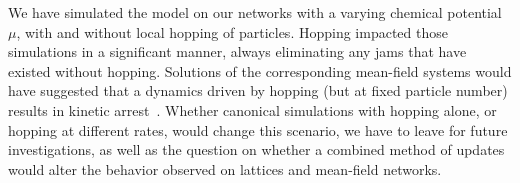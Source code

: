 We have simulated the model on our networks with a varying chemical potential $\mu$,
with and without local hopping of particles. Hopping impacted those
simulations in a significant manner, always eliminating any jams that have existed without hopping. Solutions of the corresponding mean-field systems  would have suggested that a dynamics driven by hopping (but at fixed particle number) results in kinetic arrest~\cite{Rivoire03}. Whether canonical simulations with
hopping alone, or hopping at different rates, would change this scenario, we have to leave for future investigations, as well as the question
on whether a combined method of updates would alter the behavior observed
on lattices and mean-field networks.
